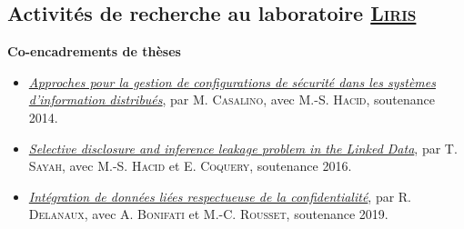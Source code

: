 \documentclass[12pt,a4paper]{article}
\newcommand{\activite}[1]{\textbf{#1}\xspace}
\newcommand{\ECO}{E. \textsc{Coquery}\xspace}
\newcommand{\LIRIS}{\textsc{Liris}\xspace}
\begin{document}
\subsection*{Activités de recherche au laboratoire \href{https://liris.cnrs.fr/}{\LIRIS}}

\activite{Co-encadrements de thèses} 
    \begin{itemize}
      \item \emph{\href{https://www.theses.fr/2014LYO10124}{Approches pour la gestion de configurations de sécurité dans les systèmes d'information distribués}}, par M. \textsc{Casalino}, avec M.-S. \textsc{Hacid}, soutenance 2014.
      \item \emph{\href{https://www.theses.fr/2016LYSE1156}{Selective disclosure and inference leakage problem in the Linked Data}}, par T. \textsc{Sayah}, avec M.-S. \textsc{Hacid} et \ECO, soutenance 2016.
      \item \href{https://perso.liris.cnrs.fr/remy.delanaux/research.html}{\emph{Intégration de données liées respectueuse de la confidentialité}}, par R. \textsc{Delanaux}, avec A. \textsc{Bonifati} et M.-C. \textsc{Rousset}, soutenance 2019.
    \end{itemize}
  
\end{document}
